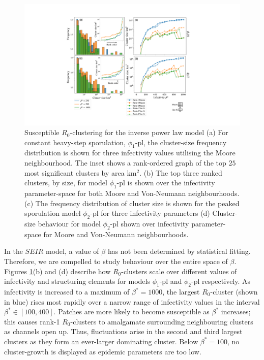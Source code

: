 \begin{figure}
    \centering
    \includegraphics[scale=0.45]{chapter6/figures/fig6-pl-cluster-distribution.pdf}
    \caption{Susceptible $R_0$-clustering for the inverse power law model (a) For constant heavy-step sporulation, $\phi_1$-pl, the cluster-size frequency distribution is shown for three infectivity values utilising the Moore neighbourhood. The inset shows a rank-ordered graph of the top $25$ most significant clusters by area $\mathrm{km^2}$. (b) The top three ranked clusters, by size, for model $\phi_1$-pl is shown over the infectivity parameter-space for both Moore and Von-Neumann neighbourhoods. (c) The frequency distribution of cluster size is shown for the peaked sporulation model $\phi_2$-pl for three infectivity parameters (d) Cluster-size behaviour for model $\phi_2$-pl shown over infectivity parameter-space for Moore and Von-Neumann neighbourhoods.}
    \label{fig:inverse-power-law-clustering}
\end{figure}

In the $SEIR$ model, a value of $\beta$ has not been determined by statistical fitting.
Therefore, we are compelled to study behaviour over the entire space of $\beta$.
Figures \ref{fig:inverse-power-law-clustering}(b) and (d) describe how $R_0$-clusters scale over different values of infectivity and structuring elements for models $\phi_1$-pl and $\phi_2$-pl respectively.
As infectivity is increased to a maximum of $\beta^*=1000$, the largest $R_0$-cluster (shown in blue) rises most rapidly over a narrow range of infectivity values in the interval $\beta^*\in [100, 400]$.
Patches are more likely to become susceptible as $\beta^*$ increases; this causes rank-1 $R_0$-clusters to amalgamate surrounding neighbouring clusters as channels open up.
Thus, fluctuations arise in the second and third largest clusters as they form an ever-larger dominating cluster.
Below $\beta^*=100$, no cluster-growth is displayed as epidemic parameters are too low. 
 
